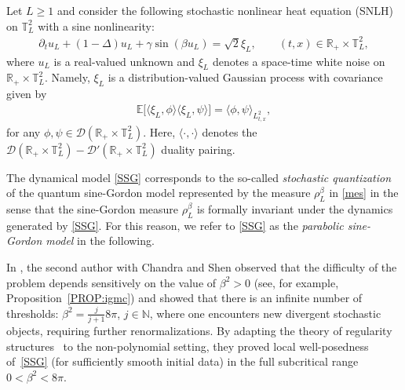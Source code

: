 \documentclass[letterpaper, 11pt,  reqno]{amsart}
\theoremstyle{myremark}
\newcommand{\1}{\hspace{0.5mm}\text{I}\hspace{0.5mm}}
\newcommand{\R}{\mathbb{R}}
\newcommand{\T}{\mathbb{T}}
\newcommand{\D}{\mathcal{D}}
\newcommand{\E}{\mathbb{E}}
\newcommand{\be}{\beta}
\newcommand{\dl}{\delta}
\newcommand{\Dl}{\Delta}
\newcommand{\g}{\gamma}
\newcommand{\dt}{\partial_t}
\newcommand{\jb}[1]
{\langle #1 \rangle}
\newcommand{\N}{\mathbb{N}}
\numberwithin{equation}{section}
\numberwithin{theorem}{section}
\begin{document}
Let $L\ge 1$ and consider 
the following stochastic nonlinear heat equation (SNLH) on $\T_L^2$
with a sine nonlinearity:
\begin{align}
\dt u_L  + (1-\Dl)  u_L   + \g \sin(\be u_L) = \sqrt{2}\xi_L, 
\qquad (t, x) \in \R_+\times\T_L^2,
\label{SSG}
\end{align}
where  $u_L$ is a real-valued unknown and $\xi_L$ denotes a space-time white noise on $\R_+ \times \T_L^2$. Namely, $\xi_L$ is a distribution-valued Gaussian process with covariance given by
\begin{align}
\E\big[ \jb{\xi_L, \phi} \jb{\xi_L, \psi}\big] = \jb{\phi, \psi}_{L^2_{t,x}},
\label{noise}
\end{align}
for any $\phi, \psi \in \mathcal D(\R_+ \times \T^2_L)$. Here, $\jb{\cdot, \cdot}$ denotes the $\D(\R_+ \times \T^2_L)-\D'(\R_+ \times \T^2_L)$ duality pairing.


The dynamical model \eqref{SSG}  corresponds to the so-called  {\it stochastic quantization}
\cite{PW}
of the quantum sine-Gordon model represented by the measure $\rho_L^\be$ in \eqref{mes}
in the sense that the sine-Gordon measure $\rho_L^\be$
is formally invariant under the dynamics generated by \eqref{SSG}.
For this reason, we refer
to \eqref{SSG}
as the {\it parabolic sine-Gordon model} in the following.





In \cite{HS, CHS}, 
the second author with Chandra and Shen
observed that 
the difficulty of the problem depends sensitively on the value of $\be^2 > 0$
(see, for example, Proposition~\ref{PROP:igmc})
and showed that 
 there is an infinite number of thresholds:
$\be^2 = \frac{j}{j+1}8\pi$, $j\in\N$, 
where one encounters new divergent stochastic objects, requiring further renormalizations.
By adapting  the theory of regularity structures~\cite{Hairer}
to the  non-polynomial setting,
they 
proved local well-posedness of~\eqref{SSG}  (for sufficiently smooth initial data)
in the full subcritical range $0<\be^2<8\pi$.


 
\end{document}

